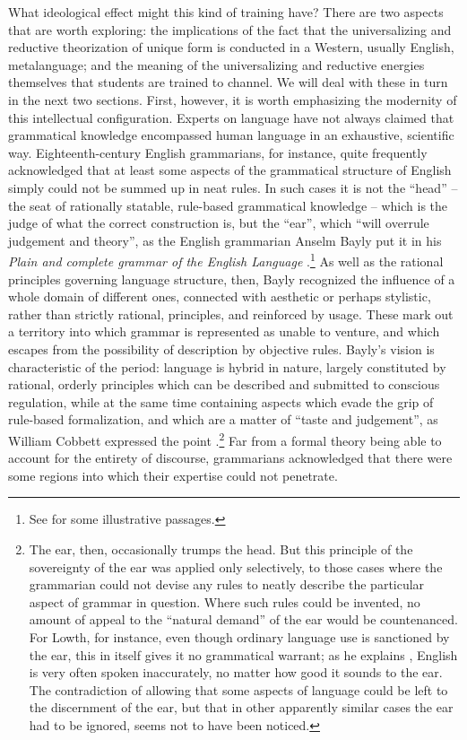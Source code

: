 \documentclass[output=paper]{langscibook}
\begin{document}
What ideological effect might this kind of training have? There are two aspects that are worth exploring: the implications of the fact that the universalizing and reductive theorization of unique form is conducted in a Western, usually English, metalanguage; and the meaning of the universalizing and reductive energies themselves that students are trained to channel. We will deal with these in turn in the next two sections. First, however, it is worth emphasizing the modernity of this intellectual configuration. Experts on language have not always claimed that grammatical knowledge encompassed human language in an exhaustive, scientific way. Eighteenth-century English grammarians, for instance, quite frequently acknowledged that at least some aspects of the grammatical structure of English simply could not be summed up in neat rules. In such cases it is not the ``head'' -- the seat of rationally statable, rule-based grammatical knowledge -- which is the judge of what the correct construction is, but the ``ear'', which ``will overrule judgement and theory'', as the English grammarian Anselm Bayly put it in his \citeyear{Bayly1772} \emph{Plain and complete grammar of the English Language} \citep[61]{Bayly1772}.\footnote{See \citet[26, 44]{Bayly1772} for some illustrative passages.} As well as the rational principles governing language structure, then, Bayly recognized the influence of a whole domain of different ones, connected with aesthetic or perhaps stylistic, rather than strictly rational, principles, and reinforced by usage. These mark out a territory into which grammar is represented as unable to venture, and which escapes from the possibility of description by objective rules. Bayly's vision is characteristic of the period: language is hybrid in nature, largely constituted by rational, orderly principles which can be described and submitted to conscious regulation, while at the same time containing aspects which evade the grip of rule-based formalization, and which are a matter of ``taste and judgement'', as William Cobbett expressed the point \citep[56]{Cobbett19831818}.\footnote{The ear, then, occasionally trumps the head. But this principle of the sovereignty of the ear was applied only selectively, to those cases where the grammarian could not devise any rules to neatly describe the particular aspect of grammar in question. Where such rules could be invented, no amount of appeal to the ``natural demand'' of the ear would be countenanced. For Lowth, for instance, even though ordinary language use is sanctioned by the ear, this in itself gives it no grammatical warrant; as he explains \citep[9]{Lowth1762}, English is very often spoken inaccurately, no matter how good it sounds to the ear. The contradiction of allowing that some aspects of language could be left to the discernment of the ear, but that in other apparently similar cases the ear had to be ignored, seems not to have been noticed.} Far from a formal theory being able to account for the entirety of discourse, grammarians acknowledged that there were some regions into which their expertise could not penetrate.
\end{document}
